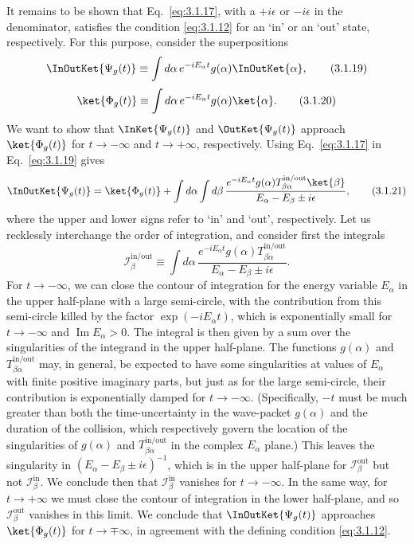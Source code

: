 It remains to be shown that Eq.~\eqref{eq:3.1.17}, with a $+i\epsilon$ or
$-i\epsilon$ in the denominator, satisfies the condition \eqref{eq:3.1.12} for an
`in' or an `out' state, respectively. For this purpose, consider the
superpositions
\begin{equation}
\InOutKet{\Psi_g(t)}
\equiv\int d\alpha\,e^{-iE_\alpha t}g(\alpha)
\InOutKet{\alpha},
\tag{3.1.19}\label{eq:3.1.19}
\end{equation}
\begin{equation}
\ket{\Phi_g(t)}\equiv
\int d\alpha\,e^{-iE_\alpha t}g(\alpha)\ket{\alpha}.
\tag{3.1.20}\label{eq:3.1.20}
\end{equation}
We want to show that $\InKet{\Psi_g(t)}$ and
$\OutKet{\Psi_g(t)}$ approach $\ket{\Phi_g(t)}$ for
$t\to-\infty$ and $t\to+\infty$, respectively. Using Eq.~\eqref{eq:3.1.17} in
Eq.~\eqref{eq:3.1.19} gives
\begin{align}
\InOutKet{\Psi_g(t)}
=\ket{\Phi_g(t)}+\int d\alpha\int d\beta\,
\frac{e^{-iE_\alpha t}g(\alpha)
T^{\mathrm{in/out}}_{\beta\alpha}\ket{\beta}}
{E_\alpha-E_\beta\mathbin{\pm}i\epsilon},
\tag{3.1.21}\label{eq:3.1.21}
\end{align}
where the upper and lower signs refer to `in' and `out', respectively. Let us
recklessly interchange the order of integration, and consider first the
integrals
\[
\mathcal{I}^{\mathrm{in/out}}_\beta\equiv
\int d\alpha\,
\frac{e^{-iE_\alpha t}g(\alpha)
T^{\mathrm{in/out}}_{\beta\alpha}}
{E_\alpha-E_\beta\mathbin{\pm}i\epsilon}.
\]
For $t\to-\infty$, we can close the contour of integration for the energy
variable $E_\alpha$ in the upper half-plane with a large semi-circle, with the
contribution from this semi-circle killed by the factor
$\exp(-iE_\alpha t)$, which is exponentially small for $t\to-\infty$ and
$\operatorname{Im}E_\alpha>0$. The integral is then given by a sum over the
singularities of the integrand in the upper half-plane. The functions
$g(\alpha)$ and $T^{\mathrm{in/out}}_{\beta\alpha}$ may, in general, be
expected to have some singularities at values of $E_\alpha$ with finite
positive imaginary parts, but just as for the large semi-circle, their
contribution is exponentially damped for $t\to-\infty$. (Specifically, $-t$
must be much greater than both the time-uncertainty in the wave-packet
$g(\alpha)$ and the duration of the collision, which respectively govern the
location of the singularities of $g(\alpha)$ and
$T^{\mathrm{in/out}}_{\beta\alpha}$ in the complex $E_\alpha$ plane.) This
leaves the singularity in
$(E_\alpha-E_\beta\mathbin{\pm}i\epsilon)^{-1}$, which is in the upper
half-plane for $\mathcal{I}^{\mathrm{out}}_\beta$ but not
$\mathcal{I}^{\mathrm{in}}_\beta$. We conclude then that
$\mathcal{I}^{\mathrm{in}}_\beta$ vanishes for $t\to-\infty$. In the same
way, for $t\to+\infty$ we must close the contour of integration in the lower
half-plane, and so $\mathcal{I}^{\mathrm{out}}_\beta$ vanishes in this limit.
We conclude that $\InOutKet{\Psi_g(t)}$ approaches
$\ket{\Phi_g(t)}$ for $t\to\mp\infty$, in agreement with the defining
condition \eqref{eq:3.1.12}.


